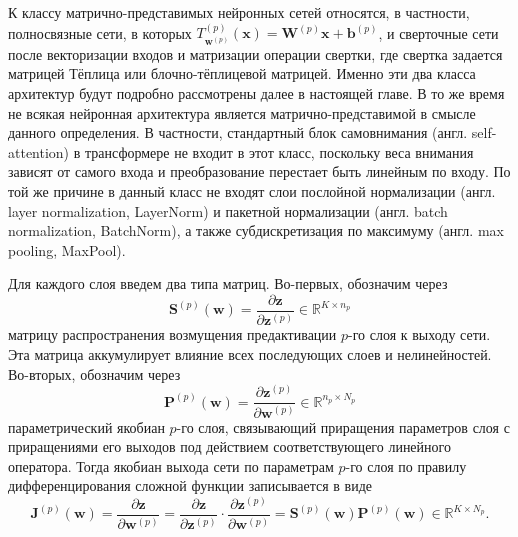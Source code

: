 \begin{remark}
    К классу матрично-представимых нейронных сетей относятся, в частности, полносвязные сети, в которых $T^{(p)}_{\mathbf w^{(p)}}(\mathbf x)=\mathbf W^{(p)}\mathbf x+\mathbf b^{(p)}$, и сверточные сети после векторизации входов и матризации операции свертки, где свертка задается матрицей Тёплица или блочно-тёплицевой матрицей. Именно эти два класса архитектур будут подробно рассмотрены далее в настоящей главе. В то же время не всякая нейронная архитектура является матрично-представимой в смысле данного определения. В частности, стандартный блок самовнимания (англ. self-attention) в трансформере не входит в этот класс, поскольку веса внимания зависят от самого входа и преобразование перестает быть линейным по входу. По той же причине в данный класс не входят слои послойной нормализации (англ. layer normalization, LayerNorm) и пакетной нормализации (англ. batch normalization, BatchNorm), а также субдискретизация по максимуму (англ. max pooling, MaxPool).
\end{remark}

Для каждого слоя введем два типа матриц. Во-первых, обозначим через
\begin{equation}
    \label{eq:layer-s}
    \mathbf{S}^{(p)}(\mathbf{w})
    =
    \frac{\partial \mathbf{z}}{\partial \mathbf{z}^{(p)}}
    \in \mathbb{R}^{K \times n_{p}}
\end{equation}
матрицу распространения возмущения предактивации $p$-го слоя к выходу сети. Эта матрица аккумулирует влияние всех последующих слоев и нелинейностей. Во-вторых, обозначим через
\begin{equation}
    \label{eq:layer-p}
    \mathbf{P}^{(p)}(\mathbf{w})
    =
    \frac{\partial \mathbf{z}^{(p)}}{\partial \mathbf{w}^{(p)}}
    \in \mathbb{R}^{n_p \times N_p}
\end{equation}
параметрический якобиан $p$-го слоя, связывающий приращения параметров слоя с приращениями его выходов под действием соответствующего линейного оператора. Тогда якобиан выхода сети по параметрам $p$-го слоя по правилу дифференцирования сложной функции записывается в виде
\begin{equation}
    \label{eq:layer-jacobian}
    \mathbf{J}^{(p)}(\mathbf{w}) = \frac{\partial \mathbf{z}}{\partial \mathbf{w}^{(p)}} = \frac{\partial \mathbf{z}}{\partial \mathbf{z}^{(p)}} \cdot \frac{\partial \mathbf{z}^{(p)}}{\partial \mathbf{w}^{(p)}} = \mathbf{S}^{(p)}(\mathbf{w}) \mathbf{P}^{(p)}(\mathbf{w}) \in \mathbb{R}^{K \times N_p}.
\end{equation}

